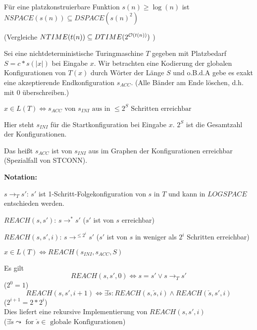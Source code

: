 \begin{satz}
    

    Für eine platzkonstruierbare Funktion $s(n) \geq \log(n)$ ist \\
    $ NSPACE(s(n)) \subseteq DSPACE(s(n)^2)$

    (Vergleiche
    $ NTIME(t(n)) \subseteq DTIME(2^{\mathcal{O}(t(n))})$
    )

\end{satz}

\begin{beweis}
    
    Sei eine nichtdeterministische Turingmaschine $T$ gegeben mit Platzbedarf $S = c * s(|x|)$ bei Eingabe $x$. Wir betrachten eine Kodierung der globalen Konfigurationen von $T(x)$ durch Wörter der Länge $S$ und o.B.d.A gebe es exakt eine akzeptierende Endkonfiguration $s_{ACC}$. (Alle Bänder am Ende löschen, d.h. mit $0$ überschreiben.)

    $
    x \in L(T) 
        \Longleftrightarrow 
    s_{ACC} \text{ von } s_{INI} \text{ aus in } \leq 2^S \text{ Schritten erreichbar}
    $

    Hier steht $s_{INI}$ für die Startkonfiguration bei Eingabe $x$. $2^S$ ist die Gesamtzahl der Konfigurationen.

    Das heißt $s_{ACC}$ ist von $s_{INI}$ aus im Graphen der Konfigurationen erreichbar (Spezialfall von STCONN).

\end{beweis}


\textbf{Notation:}

$s \rightarrow_T s'$: $s'$ ist 1-Schritt-Folgekonfiguration von $s$ in $T$ und kann in $LOGSPACE$ entschieden werden.

$REACH(s, s')$: $s \rightarrow^\ast s'$ ($s'$ ist von $s$ erreichbar)

$REACH(s, s', i)$: $s \rightarrow^{\leq 2^i} s'$ ($s'$ ist von $s$ in weniger als $2^i$ Schritten erreichbar)


$ x \in L(T) \Longleftrightarrow REACH(s_{INI}, s_{ACC}, S)$

Es gilt 
$$REACH(s, s', 0) \Longleftrightarrow s = s' \lor s \rightarrow_T s'$$
\hspace{4cm}($2^0 = 1$)
$$REACH(s, s', i+1) \Longleftrightarrow \exists \check{s} : REACH(s, \check{s}, i) \land REACH(\check{s}, s', i)$$ 
\hspace{4cm}($2^{i+1} = 2 * 2^i$)\\
Dies liefert eine rekursive Implementierung von $REACH(s,s',i)$ \\
\hspace{4cm}($\exists \check{s} \leadsto \text { for } \check{s} \in \text{ globale Konfigurationen}$)


